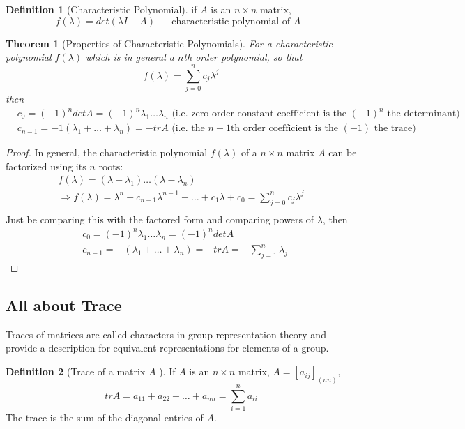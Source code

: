 \documentclass[twoside]{amsart}
\theoremstyle{plain}
\newtheorem{theorem}{Theorem}
\theoremstyle{definition}
\newtheorem{definition}{Definition}
\begin{document}
\begin{definition}[Characteristic Polynomial]\label{D:Characteristic_Polynomial}
if $A$ is an $n \times n$ matrix, 
\begin{equation}\label{E:Def_characteristic_polynomial}
f(\lambda) = det (\lambda I - A) \equiv \text{ characteristic polynomial of $A$ }
\end{equation}
\end{definition}

\begin{theorem}[Properties of Characteristic Polynomials]
  For a characteristic polynomial $f(\lambda)$ which is in general a $n$th order polynomial, so that 
\[
f(\lambda) = \sum_{j=0}^n c_j \lambda^j
\]
then 
  \begin{align}
    & c_0 = (-1)^n det A = (-1)^n \lambda_1 \dots \lambda_n  \text{ (i.e. zero order constant coefficient is the $(-1)^n $ the determinant) } \\
    & c_{n-1} = -1(\lambda_1 + \dots + \lambda_n ) = - tr A  \text{ (i.e. the $n-1$th order coefficient is the $(-1)$ the trace) }
  \end{align}
\end{theorem}
\begin{proof}
In general, the characteristic polynomial $f(\lambda)$ of a $n \times n$ matrix $A$ can be factorized using its $n$ roots: 
  \[
  \begin{gathered}
    f(\lambda)= (\lambda - \lambda_1) \dots (\lambda - \lambda_n)  \\
    \Longrightarrow f(\lambda) = \lambda^n + c_{n-1} \lambda^{n-1} + \dots + c_1 \lambda + c_0 = \sum_{j=0}^n c_j \lambda^j \\    
  \end{gathered}
  \]
Just be comparing this with the factored form and comparing powers of $\lambda$, then 
\[
\begin{aligned}
  & c_0 = (-1)^n \lambda_1 \dots \lambda_n  = (-1)^n det A  \\
  & c_{n-1} = - (\lambda_1 + \dots + \lambda_n)  = - tr A = - \sum_{j=1}^n \lambda_j
\end{aligned}
\]
\end{proof}

\subsection{ All about Trace }

Traces of matrices are called characters in group representation theory and provide a description for equivalent representations for elements of a group.  
\begin{definition}[Trace of a matrix $A$ ]
  If $A$ is an $n \times n$ matrix, $A = [a_{ij}]_{(nn)}$, 
  \begin{equation}
    tr A = a_{11} + a_{22} + \dots + a_{nn} = \sum_{i=1}^n a_{ii} 
  \end{equation}
The trace is the sum of the diagonal entries of $A$.  
\end{definition}
\end{document}
